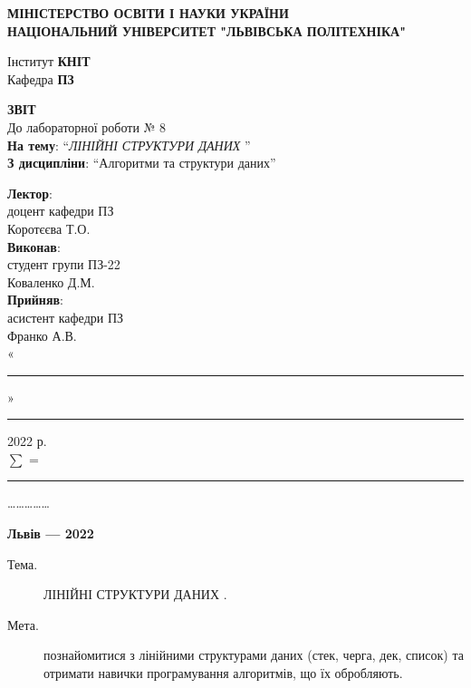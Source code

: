 \documentclass{article}
\newcommand\subject{Алгоритми та структури даних}
\newcommand\lecturer{доцент кафедри ПЗ\\Коротєєва Т.О.}
\newcommand\teacher{асистент кафедри ПЗ\\Франко А.В.}
\newcommand\mygroup{ПЗ-22}
\newcommand\lab{8}
\newcommand\theme{ЛІНІЙНІ СТРУКТУРИ ДАНИХ }
\newcommand\purpose{познайомитися з лінійними структурами даних (стек, черга, дек, список) та отримати навички програмування алгоритмів, що їх обробляють}
\begin{document}
	\begin{normalsize}
		\begin{titlepage}
			\thispagestyle{empty}
			\begin{center}
				\textbf{МІНІСТЕРСТВО ОСВІТИ І НАУКИ УКРАЇНИ\\
					НАЦІОНАЛЬНИЙ УНІВЕРСИТЕТ "ЛЬВІВСЬКА ПОЛІТЕХНІКА"}
			\end{center}
			\begin{flushright}
				Інститут \textbf{КНІТ}\\
				Кафедра \textbf{ПЗ}
			\end{flushright}
			\vspace{200pt}
			\begin{center}
				\textbf{ЗВІТ}\\
				\vspace{10pt}
				До лабораторної роботи № \lab\\
				\textbf{На тему}: “\textit{\theme}”\\
				\textbf{З дисципліни}: “\subject”
			\end{center}
			\vspace{112pt}
			\begin{flushright}
				
				\textbf{Лектор}:\\
				\lecturer\\
				\vspace{28pt}
				\textbf{Виконав}:\\
				
				студент групи \mygroup\\
				Коваленко Д.М.\\
				\vspace{28pt}
				\textbf{Прийняв}:\\
				
				\teacher\\
				
				\vspace{28pt}
				«\rule{1cm}{0.15mm}» \rule{1.5cm}{0.15mm} 2022 р.\\
				$\sum$ = \rule{1cm}{0.15mm}……………\\
				
			\end{flushright}
			\vspace{\fill}
			\begin{center}
				\textbf{Львів — 2022}
			\end{center}
		\end{titlepage}
		
		\begin{description}
			\item[Тема.] \theme.
			\item[Мета.] \purpose.
		\end{description}
		

\end{normalsize}
\end{document}
